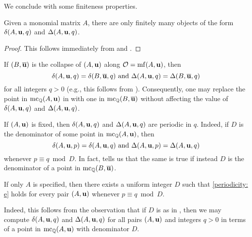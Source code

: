 \documentclass[11pt]{amsart}
\begin{document}
We conclude with some finiteness properties.




\begin{proposition}
\label{finitely many deltas for a fixed A: P}
 Given a monomial matrix $A$, there are only finitely many objects of the form $\delta(A, \mathbf{u}, q)$ and $\Delta(A, \mathbf{u}, q)$.
\end{proposition}

\begin{proof}
This follows immediately from  and .
\end{proof}

\begin{remark}  
\label{comparing deltas: R}
If $(B, \overline{\mathbf{u}})$ is the collapse of $(A, \mathbf{u})$ along $\mathcal{O} = \operatorname{mf}(A, \mathbf{u})$, then  
\[ \delta(A, \mathbf{u}, q) = \delta(B, \overline{\mathbf{u}}, q)  \text{ and }  \Delta(A, \mathbf{u},q) = \Delta(B, \overline{\mathbf{u}}, q)\] for all integers $q>0$ (e.g., this follows from ).   Consequently, one may replace the point in $\operatorname{mc}_{\mathbb{Q}}(A, \mathbf{u})$ in    with one in $\operatorname{mc}_{\mathbb{Q}}(B, \overline{\mathbf{u}})$ without affecting the value of $\delta(A, \mathbf{u}, q)$ and $\Delta(A, \mathbf{u}, q)$.
\end{remark}

\begin{remark}
\label{pair periodicity: R}
If $(A, \mathbf{u})$ is fixed, then $\delta(A, \mathbf{u}, q)$ and $\Delta(A, \mathbf{u}, q)$ are periodic in $q$.  Indeed, if $D$ is the denominator of some point in $\operatorname{mc}_{\mathbb{Q}}(A, \mathbf{u})$, then 
\begin{equation}
\label{periodicity: e}
 \delta(A, \mathbf{u}, p) = \delta(A, \mathbf{u}, q)  \text{ and } \Delta(A, \mathbf{u}, p) = \Delta(A, \mathbf{u}, q)
\end{equation} whenever $p \equiv q \bmod D$.    In fact,  tells us that the same is true if instead $D$ is the denominator of a point in $\operatorname{mc}_{\mathbb{Q}}(B, \overline{\mathbf{u}})$.
\end{remark}

\begin{remark}
\label{uniform periodicity: R}
 If only $A$ is specified, then there exists a uniform integer $D$ such that \eqref{periodicity: e} holds for every pair $(A, \mathbf{u})$ whenever $p \equiv q \bmod D$.  
 
 Indeed,  this follows from the observation that if $D$ is as in , then we may compute  $\delta(A, \mathbf{u}, q)$ and $\Delta(A, \mathbf{u}, q)$ for all pairs $(A, \mathbf{u})$ and integers $q>0$ in terms of a point in $\operatorname{mc}_{\mathbb{Q}}(A, \mathbf{u})$ with denominator $D$.
\end{remark}
\end{document}
